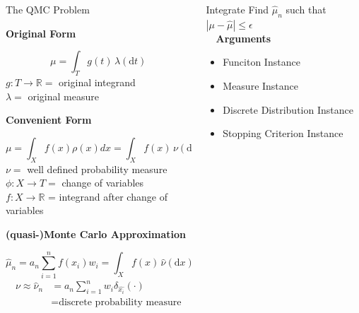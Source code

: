 \documentclass[final]{beamer}
\newcommand{\bfCenter}[1]{\centerline{\textbf{#1}}}
\newlength{\onecolwid}
\newlength{\threecolwid}
\newcommand{\dif}{\mathrm{d}}
\begin{document}
\begin{frame}[t]
\begin{columns}[t]
\begin{column}{\threecolwid}
\begin{columns}[t,totalwidth=\threecolwid]
\begin{column}{\onecolwid}
\begin{block}{The QMC Problem}
    \bfCenter{Original Form} 
        \begin{equation*}
            \mu = \int_{T} g(t) \, \lambda(\dif t) 
            \label{eq:ogProblem}
        \end{equation*}
        $ g:T \rightarrow \mathbb{R} = $ original integrand \\
        $ \lambda = $ original measure
    \bfCenter{Convenient Form}
        \begin{equation*}
            \mu = \int_{X} f(x)\rho(x)dx = \int_{X} f(x) \, \nu( \dif x)
            \label{convForm}
        \end{equation*}
        $\nu = $ well defined probability measure\\
        $\phi: X \rightarrow T = $ change of variables\\
        $f: X \rightarrow \mathbb{R} $ = integrand after change of variables
    \bfCenter{(quasi-)Monte Carlo Approximation}
        \begin{equation*}
            \hat{\mu}_n = a_n \sum_{i=1}^{n} f(x_i)w_i =  \int_{X} f(x) \, \hat{\nu}( \dif x)
            \label{qmcApprox}
        \end{equation*}
        \begin{align*}
            \nu \approx \hat{\nu}_n & = a_n \sum_{i=1}^n w_i \delta_{\hat{x_i}}(\cdot) \\
            & = \text{discrete probability measure}
        \end{align*}
\end{block}
\end{column}

\begin{column}{\onecolwid}%
\begin{alertblock}{Integrate}
    Find $\hat{\mu}_n$ such that $\left | \mu - \hat{\mu} \right  | \leq \epsilon$ \\~\
    \textbf{Arguments}
    \begin{itemize}
        \item Funciton Instance
        \item Measure Instance
        \item Discrete Distribution Instance
        \item Stopping Criterion Instance
    \end{itemize}
\end{alertblock}%


\end{column}
\end{columns}
\end{column}
\end{columns}
\end{frame}
\end{document}
